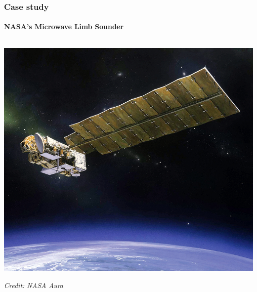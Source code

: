 \documentclass[handout]{snedecorbeamer}
\begin{document}
\begin{frame}
  \frametitle{Case study}
  \framesubtitle{NASA's Microwave Limb Sounder}

    \begin{columns}[t]
    \begin{column}{0.5\textwidth}
      \begin{center}
	\includegraphics[height=.4\textheight]{aura.jpg}

	{\footnotesize \textit{Credit: NASA Aura}}

	\vspace{5ex}


\end{center}
\end{column}
\end{columns}
\end{frame}
\end{document}
